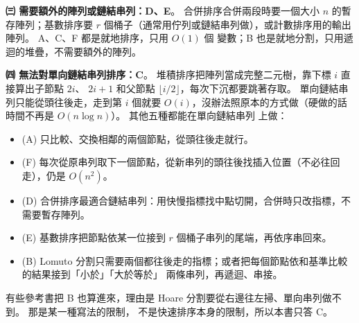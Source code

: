 \begin{pastsoln}
\textbf{㈢ 需要額外的陣列或鏈結串列：D、E}。 合併排序合併兩段時要一個大小 $n$ 的暫存陣列；基數排序要
$r$ 個桶子（通常用佇列或鏈結串列做），或計數排序用的輸出陣列。 A、C、F 都是就地排序，只用 $O(1)$ 個
變數；B 也是就地分割，只用遞迴的堆疊，不需要額外的陣列。

\textbf{㈣ 無法對單向鏈結串列排序：C}。 堆積排序把陣列當成完整二元樹，靠下標 $i$ 直接算出子節點 $2i$、
$2i + 1$ 和父節點 $\lfloor i/2 \rfloor$，每次下沉都要跳著存取。 單向鏈結串列只能從頭往後走，走到第 $i$
個就要 $O(i)$，沒辦法照原本的方式做（硬做的話時間不再是 $O(n \log n)$）。 其他五種都能在單向鏈結串列
上做：
\begin{itemize}
\item (A) 只比較、交換相鄰的兩個節點，從頭往後走就行。
\item (F) 每次從原串列取下一個節點，從新串列的頭往後找插入位置（不必往回走），仍是 $O(n^2)$。
\item (D) 合併排序最適合鏈結串列：用快慢指標找中點切開，合併時只改指標，不需要暫存陣列。
\item (E) 基數排序把節點依某一位接到 $r$ 個桶子串列的尾端，再依序串回來。
\item (B) Lomuto 分割只需要兩個都往後走的指標；或者把每個節點依和基準比較的結果接到「小於」「大於等於」
兩條串列，再遞迴、串接。
\end{itemize}
有些參考書把 B 也算進來，理由是 Hoare 分割要從右邊往左掃、單向串列做不到。 那是某一種寫法的限制，
不是快速排序本身的限制，所以本書只答 C。
\end{pastsoln}
